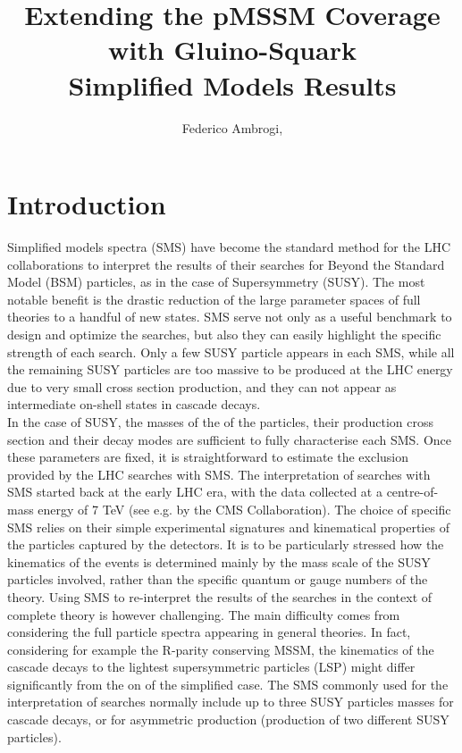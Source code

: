\documentclass[a4paper,11pt]{article}
\title{{\boldmath Extending the pMSSM Coverage with Gluino-Squark \\ Simplified Models Results}}
\author[a,]{Federico Ambrogi,\note{Corresponding author.}}
\affiliation[a]{Department of Meteorology and Geophysics, University of Vienna, Vienna, Austria}
\begin{document}
 
\maketitle
\flushbottom
\section{Introduction}
Simplified models spectra (SMS) have become the standard method for the LHC collaborations to interpret the results of their searches for Beyond the Standard Model (BSM) particles, as in the case of Supersymmetry (SUSY). The most notable benefit is the drastic reduction of the large parameter spaces of full theories to a handful of new states. SMS serve not only as a useful benchmark to design and optimize the searches, but also they can easily highlight the specific strength of each search. Only a few SUSY particle appears in each SMS, while all the remaining SUSY particles are too massive to be produced at the LHC energy due to very small cross section production, and they can not appear as intermediate on-shell states in cascade decays. 
\\
In the case of SUSY, the masses of the of the particles, their production cross section and their decay modes are sufficient to fully characterise each SMS. Once these parameters are fixed, it is straightforward to estimate the exclusion provided by the LHC searches with SMS. The interpretation of searches with SMS started back at the early LHC era, with the data collected at a centre-of-mass energy of 7 TeV (see e.g. \cite{Chatrchyan:2013sza} by the CMS Collaboration). The choice of specific SMS relies on their simple experimental signatures and kinematical properties of the particles captured by the detectors. It is to be particularly stressed how the kinematics of the events is determined mainly by the mass scale of the SUSY particles involved, rather than the specific quantum or gauge numbers of the theory. Using SMS to re-interpret the results  of  the searches in the context of complete theory is however challenging. The main difficulty comes from considering the full particle spectra appearing in general theories. In fact, considering for example the R-parity conserving MSSM, the kinematics of the cascade decays to the lightest supersymmetric particles (LSP) might differ significantly from the on of the simplified case. The SMS commonly used for the interpretation of searches normally include up to three SUSY particles masses for cascade decays, or for asymmetric production (production of two different SUSY particles).
\end{document}
